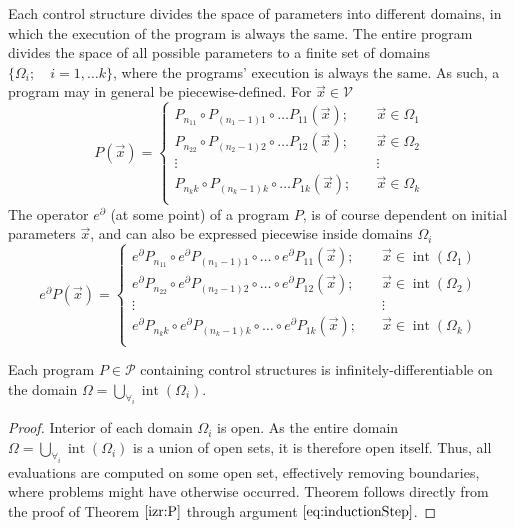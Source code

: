 \documentclass[11pt]{article}
\newcommand{\VV}{\mathcal{V}}
\newcommand{\dP}{\mathcal{P}}
\newcommand{\D}{\partial}
\DeclareMathOperator{\interior}{int}
\begin{document}
 Each control structure divides the space of parameters into different domains, in which the execution of the program is always the same. The entire program divides the space of all possible parameters to a finite set of domains $\{\Omega_i;\quad i=1,\ldots
  k\}$, where the programs' execution is always the same. As such, a program may in general be piecewise-defined. For $\vec{x}\in\VV$
 \begin{equation}
   \label{eq:zlrprk_splosno}
   P(\vec{x}) =
   \begin{cases}
     P_{n_11}\circ P_{(n_1-1)1}\circ\ldots P_{11}(\vec{x});&\quad \vec{x}\in\Omega_1\\
     P_{n_22}\circ P_{(n_2-1)2}\circ\ldots P_{12}(\vec{x});&\quad \vec{x}\in\Omega_2\\
     \vdots&\quad\vdots\\
     P_{n_kk}\circ P_{(n_k-1)k}\circ\ldots P_{1k}(\vec{x});&\quad \vec{x}\in\Omega_k\\
   \end{cases}
 \end{equation}
 The operator $e^\D$ (at some point) of a program $P$, is of course dependent on initial parameters $\vec{x}$, and can also be expressed piecewise inside domains $\Omega_i$
 \begin{equation}
   \label{eq:Dzlrprk_splosno}
   e^\D P({\vec{x}}) =
   \begin{cases}
     e^\D P_{n_11}\circ e^\D P_{(n_1-1)1}\circ\ldots\circ e^\D P_{11}(\vec{x});&\quad \vec{x}\in\interior(\Omega_1)\\
     e^\D P_{n_22}\circ e^\D P_{(n_2-1)2}\circ\ldots\circ e^\D P_{12}(\vec{x});&\quad \vec{x}\in\interior(\Omega_2)\\
     \vdots&\quad\vdots\\
     e^\D P_{n_kk}\circ e^\D P_{(n_k-1)k}\circ\ldots\circ e^\D P_{1k}(\vec{x});&\quad \vec{x}\in\interior(\Omega_k)\\
   \end{cases}
 \end{equation}

 \begin{theorem}\label{izr:diferentiableOnDomain}
 Each program $P\in\dP$ containing control structures is infinitely-differentiable on the domain $\Omega=\bigcup\limits_{\forall_i}\interior(\Omega_i)$.
 \end{theorem}
 \begin{proof}
  Interior of each domain $\Omega_i$ is open. As the entire domain $\Omega=\bigcup\limits_{\forall_i}\interior(\Omega_i)$ is a union of open sets, it is therefore open itself. Thus, all evaluations are computed on some open set, effectively removing boundaries, where problems might have otherwise occurred. Theorem follows directly from the proof of Theorem $\ref{izr:P}$ through argument $\eqref{eq:inductionStep}$.
 \end{proof}
 
\end{document}
